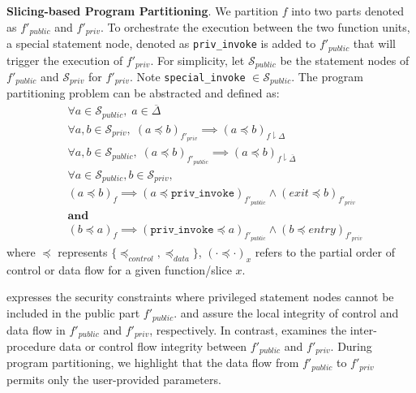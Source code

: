 \begin{definition}{\textbf{Slicing-based Program Partitioning}.} \label{def:partition}
We partition $f$ into two parts denoted as $f'_{public}$ and $f'_{priv}$.
To orchestrate the execution between the two function units,
a special statement node, denoted as \texttt{priv\_invoke} is added to $f'_{public}$ that will trigger the execution of $f'_{priv}$. 
For simplicity, let $\mathcal{S}_{public}$ be the statement nodes of $f'_{public}$ and $\mathcal{S}_{priv}$ for $f'_{priv}$. Note \texttt{special\_invoke} $\in \mathcal{S}_{public}$.
The program partitioning problem can be abstracted and defined as: 
\begin{align}
    &\forall a \in \mathcal{S}_{public}, \; a\in \overline{\Delta} \label{eq:inclusion} \\ 
    &\forall a,b \in \mathcal{S}_{priv}, \;  (a \preceq b)_{f'_{priv}} \implies (a \preceq b)_{f\downharpoonright {\Delta}} \label{eq:imply_one} \\ 
    &\forall a,b \in \mathcal{S}_{public}, \;  (a  \preceq b)_{f'_{public}} \implies (a \preceq b)_{f\downharpoonright \overline{\Delta}} \label{eq:imply_two} \\ 
    &\forall a \in \mathcal{S}_{public}, b \in \mathcal{S}_{priv},\;\nonumber\\ 
   &(a \preceq b)_{f} \implies (a \preceq \texttt{priv\_invoke})_{f'_{public}} \land ({exit} \preceq b)_{f'_{priv}}   \nonumber \\
   &\textbf{and}\;\label{eq:imply_three}\\ 
   &(b \preceq a)_{f} \implies (\texttt{priv\_invoke} \preceq a)_{f'_{public}} \land (b \preceq entry)_{f'_{priv}} \nonumber 
\end{align}    
where $\preceq$ represents $\{\preceq_{control}, \preceq_{data}\}$, $(\cdot \preceq \cdot)_x$ refers to the partial order of control or data flow for a given function/slice $x$.     
\end{definition}


 expresses the security constraints where privileged statement nodes cannot be included in the public part $f'_{public}$.
 and  assure the local integrity of control and data flow in $f'_{public}$ and $f'_{priv}$, respectively.
In contrast,  examines the inter-procedure data or control flow integrity between $f'_{public}$ and $f'_{priv}$.
During program partitioning, we highlight that the data flow from $f'_{public}$ to $f'_{priv}$ permits only the user-provided parameters. 

